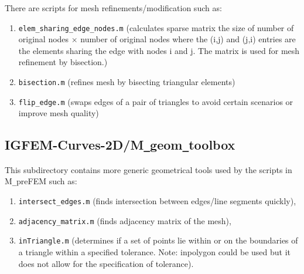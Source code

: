 \documentclass[11pt,letterpaper]{article}
\begin{document}
There are scripts for mesh refinements/modification such as:
\begin{enumerate}
\item \texttt{elem\_sharing\_edge\_nodes.m} (calculates sparse matrix the size of number of original nodes $\times$ number of original nodes where the (i,j) and (j,i) entries are the elements sharing the edge with nodes i and j. The matrix is used for mesh refinement by bisection.)
\item \texttt{bisection.m} (refines mesh by bisecting triangular elements)
\item \texttt{flip\_edge.m} (swaps edges of a pair of triangles to avoid certain scenarios or improve mesh quality)
\end{enumerate} 

\subsection{IGFEM-Curves-2D/M\texttt{\_}geom\texttt{\_}toolbox}
This subdirectory contains more generic geometrical tools used by the scripts in M\texttt{\_}preFEM such as:
\begin{enumerate}
\item \texttt{intersect\_edges.m} (finds intersection between edges/line segments quickly),
\item \texttt{adjacency\_matrix.m} (finds adjacency matrix of the mesh),
\item \texttt{inTriangle.m} (determines if a set of points lie within or on the boundaries of a triangle within a specified tolerance. Note: inpolygon could be used but it does not allow for the specification of tolerance).  
\end{enumerate}
\end{document}
